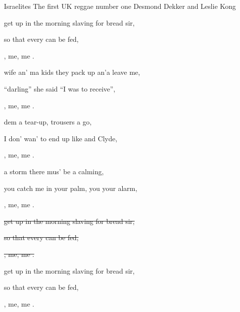 \begin{SBSong}{Israelites}
  {The first UK reggae number one}
  {Desmond Dekker and Leslie Kong}
  \SBDirection{}
  \begin{SBVerse}
	 get up in the morning slaving for bread sir,
	
	so that every  can be fed,
	
	,  me, me . 
  \end{SBVerse}
  \begin{SBVerse}
	 wife an' ma kids they pack up an'a leave me,
	
	``darling'' she said ``I was  to receive'',
	
	,  me, me . 
  \end{SBVerse}
  \begin{SBVerse}
	 dem a tear-up, trousers a go,
	
	I don' wan' to end up like  and Clyde,
	
	,  me, me . 
  \end{SBVerse}
  \begin{SBVerse}
	 a storm there mus' be a calming,
	
	you catch me in your palm, you  your alarm,
	
	,  me, me . 
  \end{SBVerse}
  \begin{SBVerse}

	\sout{ get up in the morning slaving for bread sir,}
	
	\sout{so that every  can be fed,}
	
	\sout{,  me, me . }
  \end{SBVerse}
  \begin{SBVerse}
	 get up in the morning slaving for bread sir,
	
	so that every  can be fed,
	
	,  me, me . 
  \end{SBVerse}
\end{SBSong}
